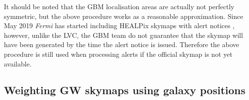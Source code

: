 \begin{colsection}
It should be noted that the GBM localisation areas are actually not perfectly symmetric, but the above procedure works as a reasonable approximation. Since May 2019 \textit{Fermi} has started including HEALPix skymaps with alert notices \citep{Fermi_skymaps}, however, unlike the LVC, the GBM team do not guarantee that the skymap will have been generated by the time the alert notice is issued. Therefore the above procedure is still used when processing alerts if the official skymap is not yet available.

\newpage

\end{colsection}


\subsection{Weighting GW skymaps using galaxy positions}
\label{sec:galaxy_skymaps}
